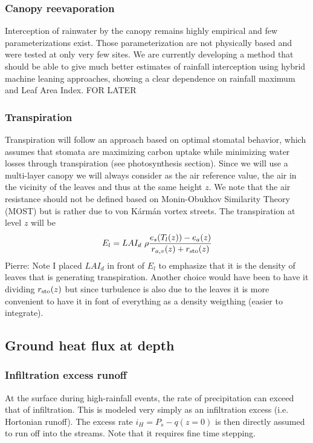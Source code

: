 \documentclass{report}
\begin{document}
\subsubsection{Canopy reevaporation}
Interception of rainwater by the canopy remains highly empirical and few parameterizations exist. Those parameterization are not physically based and were tested at only very few sites. We are currently developing a method that should be able to give much better estimates of rainfall interception using hybrid machine leaning approaches, showing a clear dependence on rainfall maximum and Leaf Area Index. FOR LATER

\subsubsection{Transpiration}
Transpiration will follow an approach based on optimal stomatal behavior, which assumes that stomata are maximizing carbon uptake while minimizing water losses through transpiration (see photosynthesis section). 
Since we will use a multi-layer canopy we will always consider as the air reference value, the air in the vicinity of the leaves and thus at the same height $z$. We note that the air resistance should not be defined based on Monin-Obukhov Similarity Theory (MOST) but is rather due to von Kármán vortex streets.
The transpiration at level $z$ will be
\begin{equation}
    E_l = LAI_d \ \rho \frac{e_s(T_l(z))-e_{a}(z)}{r_{a,v}(z)+r_{\rm sto}(z)}
\end{equation}
Pierre: Note I placed $LAI_d$ in front of $E_l$ to emphasize that it is the density of leaves that is generating transpiration. Another choice would have been to have it dividing $r_{\rm sto}(z)$ but since turbulence is also due to the leaves it is more convenient to have it in font of everything as a density weigthing (easier to integrate).

\subsection{Ground heat flux at depth}
\subsubsection{Infiltration excess runoff}
At the surface during high-rainfall events, the rate of precipitation can exceed that of infiltration. This is modeled very simply as an infiltration excess (i.e. Hortonian runoff). The excess rate $i_H = P_s-q(z=0)$ is then directly assumed to run off into the streams. Note that it requires fine time stepping.
\end{document}
